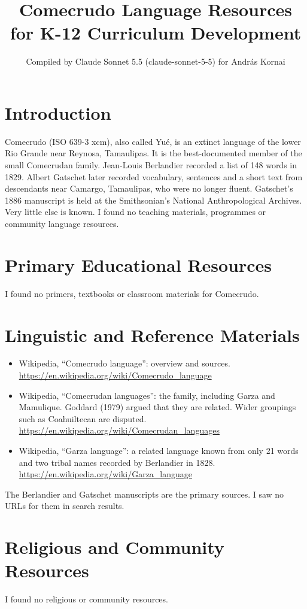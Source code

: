 \documentclass[12pt]{article}
\title{Comecrudo Language Resources for K-12 Curriculum Development}
\author{Compiled by Claude Sonnet 5.5 (claude-sonnet-5-5) for Andr\'as Kornai}
\date{}
\begin{document}
\maketitle

\section{Introduction}
Comecrudo (ISO 639-3 xcm), also called Yu\'e, is an extinct language of the lower Rio Grande near Reynosa, Tamaulipas. It is the best-documented member of the small Comecrudan family. Jean-Louis Berlandier recorded a list of 148 words in 1829. Albert Gatschet later recorded vocabulary, sentences and a short text from descendants near Camargo, Tamaulipas, who were no longer fluent. Gatschet's 1886 manuscript is held at the Smithsonian's National Anthropological Archives. Very little else is known. I found no teaching materials, programmes or community language resources.

\section{Primary Educational Resources}
I found no primers, textbooks or classroom materials for Comecrudo.

\section{Linguistic and Reference Materials}
\begin{itemize}
\item Wikipedia, ``Comecrudo language'': overview and sources. \url{https://en.wikipedia.org/wiki/Comecrudo_language}
\item Wikipedia, ``Comecrudan languages'': the family, including Garza and Mamulique. Goddard (1979) argued that they are related. Wider groupings such as Coahuiltecan are disputed. \url{https://en.wikipedia.org/wiki/Comecrudan_languages}
\item Wikipedia, ``Garza language'': a related language known from only 21 words and two tribal names recorded by Berlandier in 1828. \url{https://en.wikipedia.org/wiki/Garza_language}
\end{itemize}
The Berlandier and Gatschet manuscripts are the primary sources. I saw no URLs for them in search results.

\section{Religious and Community Resources}
I found no religious or community resources.
\end{document}
